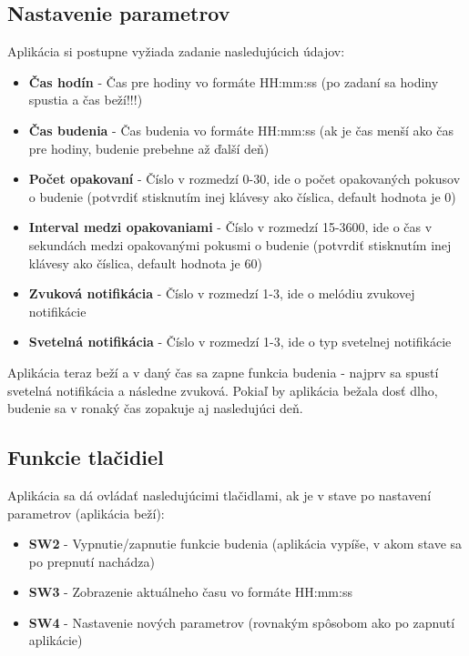 \documentclass{article}
\begin{document}
        \subsection{Nastavenie parametrov}
            Aplikácia si postupne vyžiada zadanie nasledujúcich údajov:
            \begin{itemize}
                \item \textbf{Čas hodín} - Čas pre hodiny vo formáte HH:mm:ss (po zadaní sa hodiny spustia a čas beží!!!)
                \item \textbf{Čas budenia} - Čas budenia vo formáte HH:mm:ss (ak je čas menší ako čas pre hodiny, budenie prebehne až ďalší deň)
                \item \textbf{Počet opakovaní} - Číslo v rozmedzí 0-30, ide o počet opakovaných pokusov o budenie (potvrdiť stisknutím inej klávesy ako číslica, default hodnota je 0)
                \item \textbf{Interval medzi opakovaniami} - Číslo v rozmedzí 15-3600, ide o čas v sekundách medzi opakovanými pokusmi o budenie (potvrdiť stisknutím inej klávesy ako číslica, default hodnota je 60)
                \item \textbf{Zvuková notifikácia} - Číslo v rozmedzí 1-3, ide o melódiu zvukovej notifikácie 
                \item \textbf{Svetelná notifikácia} - Číslo v rozmedzí 1-3, ide o typ svetelnej notifikácie
            \end{itemize}
            Aplikácia teraz beží a v daný čas sa zapne funkcia budenia - najprv sa spustí svetelná notifikácia a následne zvuková.
            Pokiaľ by aplikácia bežala dosť dlho, budenie sa v ronaký čas zopakuje aj nasledujúci deň.

        \subsection{Funkcie tlačidiel}
            Aplikácia sa dá ovládať nasledujúcimi tlačidlami, ak je v stave po nastavení parametrov (aplikácia beží):
            \begin{itemize}
                \item \textbf{SW2} - Vypnutie/zapnutie funkcie budenia (aplikácia vypíše, v akom stave sa po prepnutí nachádza)
                \item \textbf{SW3} - Zobrazenie aktuálneho času vo formáte HH:mm:ss
                \item \textbf{SW4} - Nastavenie nových parametrov (rovnakým spôsobom ako po zapnutí aplikácie)
            \end{itemize}
\end{document}
